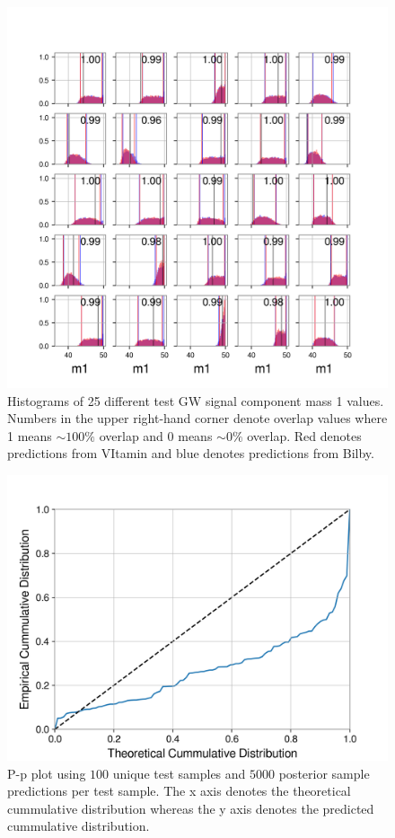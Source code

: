 \documentclass[%
showpacs,
 amsmath,amssymb,
 aps,
 twocolumn,
 prl,
 reprint,
floatfix,
]{revtex4-1}
\begin{document}
%
%
\begin{figure}
    \includegraphics[width=\columnwidth]{images/latest-1d_0.png}
    \caption{\label{fig:1D_overlap} Histograms of 
    25 different test GW signal component mass 1 values. 
    Numbers in the upper right-hand corner denote overlap 
    values where 1 means $\sim{100}\%$ overlap and 0 
    means $\sim{0}\%$ overlap.
    Red denotes predictions from VItamin and blue 
    denotes predictions from Bilby.}
\end{figure}

%
%
\begin{figure}
    \includegraphics[width=\columnwidth]{images/latest_pp_plot.png}
    \caption{\label{fig:pp_plot} P-p plot 
    using $100$ unique test samples and $5000$
    posterior sample predictions per test sample. 
    The x axis denotes the theoretical cummulative 
    distribution whereas the y axis denotes 
    the predicted cummulative distribution.}
\end{figure}
\end{document}
